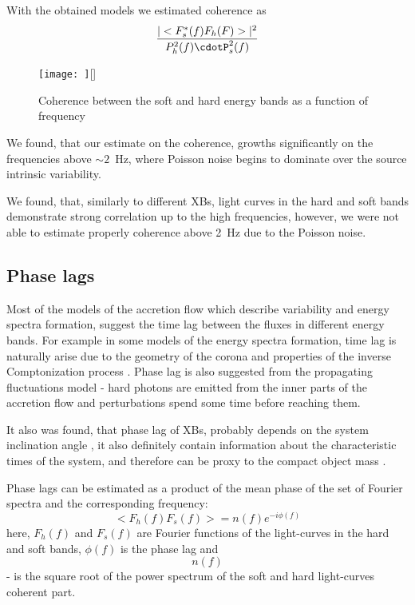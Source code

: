 With the obtained models we estimated coherence as 
$$\frac{|<F_s^*(f)F_h(F)>|^2}{P_{h}^2(f)\cdotP_{s}^2(f)}$$

\begin{figure}
\texttt{[image: ]}[] 
\caption{Coherence between the soft and hard energy bands as a function of frequency} %
\label{fig:coherence}
\end{figure}

We found, that our estimate on the coherence, growths significantly on the frequencies above $\sim2$~Hz, where Poisson noise begins to dominate over the source intrinsic variability.

We found, that, similarly to different XBs, light curves in the hard and soft bands demonstrate strong correlation up to the high frequencies, however, we were not able to estimate properly coherence above 2~Hz due to the Poisson noise.

\subsection{Phase lags}
    Most of the models of the accretion flow which describe variability and energy spectra formation, suggest the time lag between the fluxes in different energy bands. 
For example in some models of the energy spectra formation, time lag is naturally arise due to the geometry of the corona and properties of the inverse Comptonization process \citep[see, e.g.][]{kotov01}.
Phase lag is also suggested from the propagating fluctuations model - hard photons are emitted from the inner parts of the accretion flow and perturbations spend some time before reaching them. 

It also was found, that phase lag of XBs, probably depends on the system inclination angle \citep{eijeden17}, it also definitely contain information about the characteristic times of the system, and therefore can be proxy to the compact object mass \citep{}. 

Phase lags can be estimated as a product of the mean phase of the set of Fourier spectra and the corresponding frequency:
$$<F_h(f)F_s(f)> = n(f)e^{-i\phi(f)}$$ 
here, $F_h(f)$ and $F_s(f)$ are Fourier functions of the light-curves in the hard and soft bands, $\phi(f)$ is the phase lag and $$n(f)$$ - is the square root of the power spectrum of the soft and hard light-curves coherent part. 

